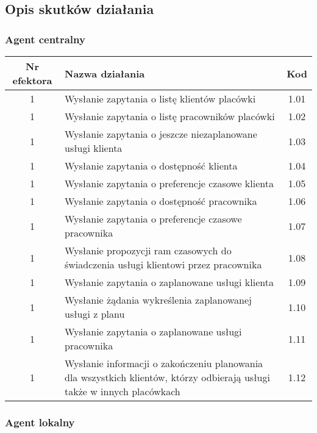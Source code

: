 \subsection{Opis skutków działania}

\subsubsection{Agent centralny}

\begin{tabular}{c|p{5cm}|c}
Nr efektora & Nazwa działania & Kod\\
\hline
1 & Wysłanie zapytania o listę klientów placówki & 1.01\\
1 & Wysłanie zapytania o listę pracowników placówki & 1.02\\
1 & Wysłanie zapytania o jeszcze niezaplanowane usługi klienta & 1.03\\
1 & Wysłanie zapytania o dostępność klienta & 1.04\\
1 & Wysłanie zapytania o preferencje czasowe klienta & 1.05\\
1 & Wysłanie zapytania o dostępność pracownika & 1.06\\
1 & Wysłanie zapytania o preferencje czasowe pracownika & 1.07\\
1 & Wysłanie propozycji ram czasowych do świadczenia usługi klientowi przez pracownika & 1.08\\
1 & Wysłanie zapytania o zaplanowane usługi klienta & 1.09\\
1 & Wysłanie żądania wykreślenia zaplanowanej usługi z planu & 1.10\\
1 & Wysłanie zapytania o zaplanowane usługi pracownika & 1.11\\
1 & Wysłanie informacji o zakończeniu planowania dla wszystkich klientów, którzy odbierają usługi także w innych placówkach & 1.12\\
\end{tabular}

\subsubsection{Agent lokalny}

